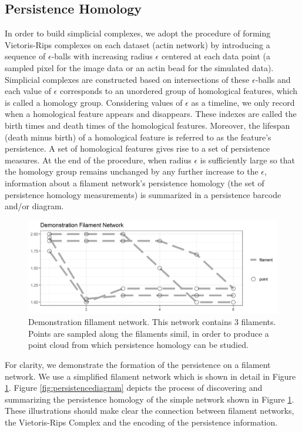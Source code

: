 \documentclass[10pt]{article}
\begin{document}
\subsection{Persistence Homology}
In order to build simplicial complexes, we adopt the procedure of forming Vietoris-Rips complexes on each dataset (actin network) by introducing a sequence of $\epsilon$-balls with increasing radius $\epsilon$ centered at each data point (a sampled pixel for the image data or an actin bead for the simulated data). Simplicial complexes are constructed based on intersections of these $\epsilon$-balls and each value of $\epsilon$ corresponds to an unordered group of homological features, which is called a homology group. Considering values of $\epsilon$ as a timeline, we only record when a homological feature appears and disappears. These indexes are called the birth times and death times of the homological features. Moreover, the lifespan (death minus birth) of a homological feature is referred to as the feature's persistence. A set of homological features gives rise to a set of persistence measures. At the end of the procedure, when radius $\epsilon$ is sufficiently large so that the homology group remains unchanged by any further increase to the $\epsilon$, information about a filament network's persistence homology (the set of persistence homology measurements) is summarized in a persistence barcode and/or diagram.

\begin{figure}[H]
	\begin{center}
		\includegraphics[width=.75\textwidth]{figures/filaments_demo.png}
	\end{center}
	\caption{Demonstration fillament network. This network contains 3 filaments. Points are sampled along the filaments simil, in order to produce a point cloud from which persistence homology can be studied.}
	\label{fig:demoNetwork}
\end{figure}

For clarity, we demonstrate the formation of the persistence on a filament network. We use a simplified filament network which is shown in detail in Figure \ref{fig:demoNetwork}. Figure \ref{fig:persistencediagram} depicts the process of discovering and summarizing the persistence homology of the simple network shown in Figure \ref{fig:demoNetwork}. These illustrations should make clear the connection between filament networks, the Vietoris-Rips Complex and the encoding of the persistence information. 
\end{document}
